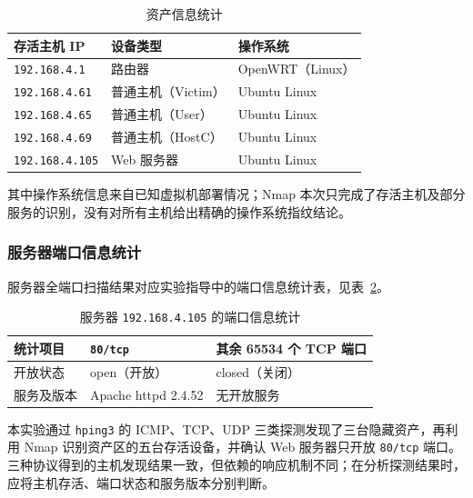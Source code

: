 \begin{table}[H]
    \centering
    \caption{资产信息统计}
    \label{tab:task1-assets}
    \renewcommand{\arraystretch}{1.2}
    \begin{tabularx}{\linewidth}{l l X}
        \toprule
        存活主机 IP & 设备类型 & 操作系统 \\
        \midrule
        \texttt{192.168.4.1} & 路由器 & OpenWRT（Linux） \\
        \texttt{192.168.4.61} & 普通主机（Victim） & Ubuntu Linux \\
        \texttt{192.168.4.65} & 普通主机（User） & Ubuntu Linux \\
        \texttt{192.168.4.69} & 普通主机（HostC） & Ubuntu Linux \\
        \texttt{192.168.4.105} & Web 服务器 & Ubuntu Linux \\
        \bottomrule
    \end{tabularx}
\end{table}

其中操作系统信息来自已知虚拟机部署情况；Nmap 本次只完成了存活主机及部分服务的识别，没有对所有主机给出精确的操作系统指纹结论。

\subsubsection{服务器端口信息统计}

服务器全端口扫描结果对应实验指导中的端口信息统计表，见表~\ref{tab:task1-ports}。

\begin{table}[H]
    \centering
    \caption{服务器 \texttt{192.168.4.105} 的端口信息统计}
    \label{tab:task1-ports}
    \renewcommand{\arraystretch}{1.2}
    \begin{tabularx}{\linewidth}{l l X}
        \toprule
        统计项目 & \texttt{80/tcp} & 其余 65534 个 TCP 端口 \\
        \midrule
        开放状态 & open（开放） & closed（关闭） \\
        服务及版本 & Apache httpd 2.4.52 & 无开放服务 \\
        \bottomrule
    \end{tabularx}
\end{table}

本实验通过 \texttt{hping3} 的 ICMP、TCP、UDP 三类探测发现了三台隐藏资产，再利用 Nmap 识别资产区的五台存活设备，并确认 Web 服务器只开放 \texttt{80/tcp} 端口。三种协议得到的主机发现结果一致，但依赖的响应机制不同；在分析探测结果时，应将主机存活、端口状态和服务版本分别判断。
